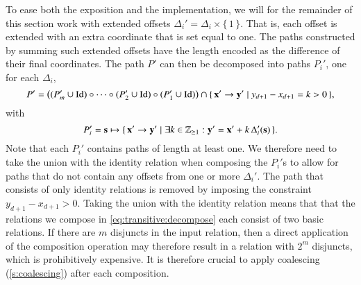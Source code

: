 To ease both the exposition and the implementation, we will for
the remainder of this section work with extended offsets
$\Delta_i' = \Delta_i \times \{\, 1 \,\}$.
That is, each offset is extended with an extra coordinate that is
set equal to one.  The paths constructed by summing such extended
offsets have the length encoded as the difference of their
final coordinates.  The path $P'$ can then be decomposed into
paths $P_i'$, one for each $\Delta_i$,
\begin{equation}
\label{eq:transitive:decompose}
P' = \left(
(P_m' \cup \identity) \circ \cdots \circ
(P_2' \cup \identity) \circ
(P_1' \cup \identity)
\right) \cap
\{\,
\vec x' \to \vec y' \mid y_{d+1} - x_{d+1} = k > 0
\,\}
,
\end{equation}
with
$$
P_i' = \vec s \mapsto \{\, \vec x' \to \vec y' \mid
\exists k \in \Z_{\ge 1} :
\vec y' = \vec x' + k \, \Delta_i'(\vec s)
\,\}
.
$$
Note that each $P_i'$ contains paths of length at least one.
We therefore need to take the union with the identity relation
when composing the $P_i'$s to allow for paths that do not contain
any offsets from one or more $\Delta_i'$.
The path that consists of only identity relations is removed
by imposing the constraint $y_{d+1} - x_{d+1} > 0$.
Taking the union with the identity relation means that
that the relations we compose in \eqref{eq:transitive:decompose}
each consist of two basic relations.  If there are $m$
disjuncts in the input relation, then a direct application
of the composition operation may therefore result in a relation
with $2^m$ disjuncts, which is prohibitively expensive.
It is therefore crucial to apply coalescing (\autoref{s:coalescing})
after each composition.

